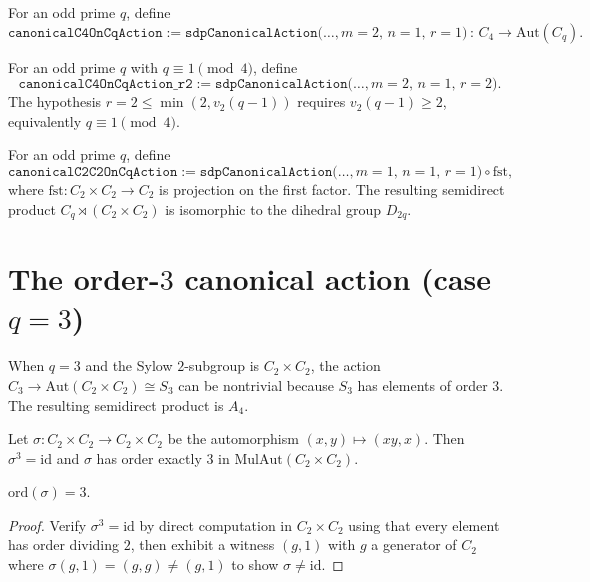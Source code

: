 \begin{definition}
    \label{def:canonicalC4OnCq-r1}
    For an odd prime $q$, define
    \[
        \mathtt{canonicalC4OnCqAction} :=
            \mathtt{sdpCanonicalAction}\bigl(\dots, m = 2,\, n = 1,\, r = 1\bigr)
            \,:\, C_4 \to \mathrm{Aut}(C_q).
    \]
\end{definition}

\begin{definition}
    \label{def:canonicalC4OnCq-r2}
    For an odd prime $q$ with $q \equiv 1 \pmod 4$, define
    \[
        \mathtt{canonicalC4OnCqAction\_r2} :=
            \mathtt{sdpCanonicalAction}\bigl(\dots, m = 2,\, n = 1,\, r = 2\bigr).
    \]
    The hypothesis $r = 2 \leq \min(2, v_2(q - 1))$ requires $v_2(q-1) \geq 2$,
    equivalently $q \equiv 1 \pmod 4$.
\end{definition}

\begin{definition}
    \label{def:canonicalC2C2OnCq}
    For an odd prime $q$, define
    \[
        \mathtt{canonicalC2C2OnCqAction} :=
            \mathtt{sdpCanonicalAction}\bigl(\dots, m = 1,\, n = 1,\, r = 1\bigr)
            \circ \mathrm{fst},
    \]
    where $\mathrm{fst} : C_2 \times C_2 \to C_2$ is projection on the first
    factor. The resulting semidirect product $C_q \rtimes (C_2 \times C_2)$
    is isomorphic to the dihedral group $D_{2q}$.
\end{definition}

\section{The order-$3$ canonical action (case $q = 3$)}

When $q = 3$ and the Sylow $2$-subgroup is $C_2 \times C_2$, the action
$C_3 \to \mathrm{Aut}(C_2 \times C_2) \cong S_3$ can be nontrivial because
$S_3$ has elements of order $3$. The resulting semidirect product is $A_4$.

\begin{definition}
    \label{def:c2c2OrderThreeAut}
    Let $\sigma : C_2 \times C_2 \to C_2 \times C_2$ be the automorphism
    $(x, y) \mapsto (xy, x)$. Then $\sigma^3 = \mathrm{id}$ and $\sigma$ has
    order exactly $3$ in $\mathrm{MulAut}(C_2 \times C_2)$.
\end{definition}
\begin{lemma}
    \label{lem:orderOf-c2c2OrderThreeAut}
    $\mathrm{ord}(\sigma) = 3$.
\end{lemma}
\begin{proof}
    Verify $\sigma^3 = \mathrm{id}$ by direct computation in $C_2 \times C_2$
    using that every element has order dividing $2$, then exhibit a witness
    $(g, 1)$ with $g$ a generator of $C_2$ where $\sigma(g, 1) = (g, g)
    \neq (g, 1)$ to show $\sigma \neq \mathrm{id}$.
\end{proof}

